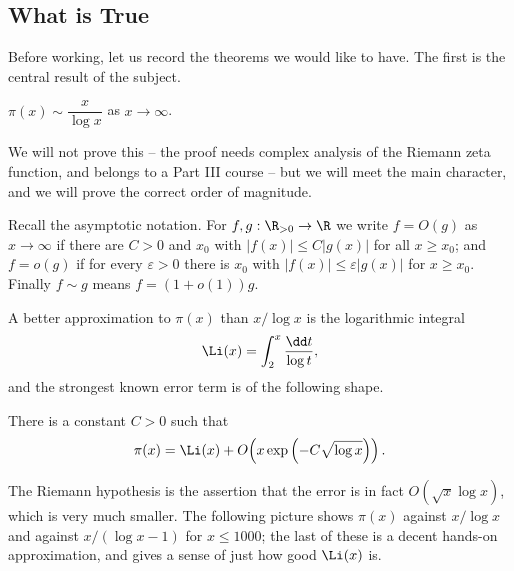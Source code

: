 \subsection{What is True}

Before working, let us record the theorems we would like to have. The first is the central result of the subject.

\begin{theorem}\label{thm:pnt}
	$\pi(x) \sim \dfrac{x}{\log x}$ as $x \to \infty$.
\end{theorem}

We will not prove this -- the proof needs complex analysis of the Riemann zeta function, and belongs to a Part III course -- but we will meet the main character, and we will prove the correct order of magnitude.

\begin{remark}
	Recall the asymptotic notation. For $f, g : \R_{>0} \to \R$ we write $f = O(g)$ as $x \to \infty$ if there are $C > 0$ and $x_0$ with $|f(x)| \leq C|g(x)|$ for all $x \geq x_0$; and $f = o(g)$ if for every $\varepsilon > 0$ there is $x_0$ with $|f(x)| \leq \varepsilon|g(x)|$ for $x \geq x_0$. Finally $f \sim g$ means $f = (1 + o(1))g$.
\end{remark}

A better approximation to $\pi(x)$ than $x/\log x$ is the logarithmic integral
$$
\Li(x) = \int_2^x \frac{\dd t}{\log t},
$$
and the strongest known error term is of the following shape.

\begin{theorem}
	There is a constant $C > 0$ such that
	$$
	\pi(x) = \Li(x) + O\!\left(x \exp\left(-C\sqrt{\log x}\right)\right).
	$$
\end{theorem}

The Riemann hypothesis is the assertion that the error is in fact $O(\sqrt x \log x)$, which is very much smaller. The following picture shows $\pi(x)$ against $x/\log x$ and against $x/(\log x - 1)$ for $x \leq 1000$; the last of these is a decent hands-on approximation, and gives a sense of just how good $\Li(x)$ is.

